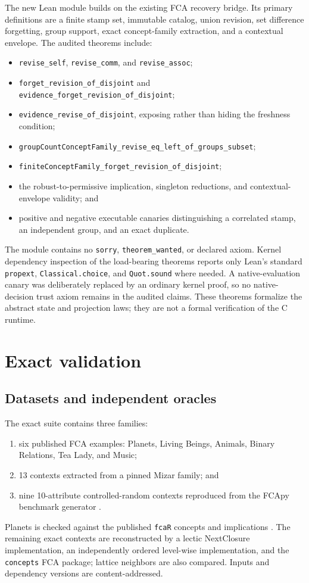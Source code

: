 \documentclass[11pt]{article}
\newcommand{\code}[1]{\nolinkurl{#1}}
\begin{document}
The new Lean module builds on the existing FCA recovery bridge. Its primary
definitions are a finite stamp set, immutable catalog, union revision, set
difference forgetting, group support, exact concept-family extraction, and a
contextual envelope. The audited theorems include:
\begin{itemize}
  \item \code{revise_self}, \code{revise_comm}, and \code{revise_assoc};
  \item \code{forget_revision_of_disjoint} and
        \code{evidence_forget_revision_of_disjoint};
  \item \code{evidence_revise_of_disjoint}, exposing rather than hiding the
        freshness condition;
  \item \code{groupCountConceptFamily_revise_eq_left_of_groups_subset};
  \item \code{finiteConceptFamily_forget_revision_of_disjoint};
  \item the robust-to-permissive implication, singleton reductions, and
        contextual-envelope validity; and
  \item positive and negative executable canaries distinguishing a correlated
        stamp, an independent group, and an exact duplicate.
\end{itemize}

The module contains no \code{sorry}, \code{theorem_wanted}, or declared axiom.
Kernel dependency inspection of the load-bearing theorems reports only Lean's
standard \code{propext}, \code{Classical.choice}, and \code{Quot.sound} where
needed. A native-evaluation canary was deliberately replaced by an ordinary
kernel proof, so no native-decision trust axiom remains in the audited claims.
These theorems formalize the abstract state and projection laws; they are not a
formal verification of the C runtime.

\section{Exact validation}
\label{sec:exact}

\subsection{Datasets and independent oracles}

The exact suite contains three families:
\begin{enumerate}
  \item six published FCA examples: Planets, Living Beings, Animals, Binary
        Relations, Tea Lady, and Music;
  \item 13 contexts extracted from a pinned Mizar family; and
  \item nine 10-attribute controlled-random contexts reproduced from the
        FCApy benchmark generator \cite{fcapy}.
\end{enumerate}
Planets is checked against the published \texttt{fcaR} concepts and
implications \cite{fcar}. The remaining exact contexts are reconstructed by a
lectic NextClosure implementation, an independently ordered level-wise
implementation, and the \texttt{concepts} FCA package; lattice neighbors are
also compared. Inputs and dependency versions are content-addressed.
\end{document}
